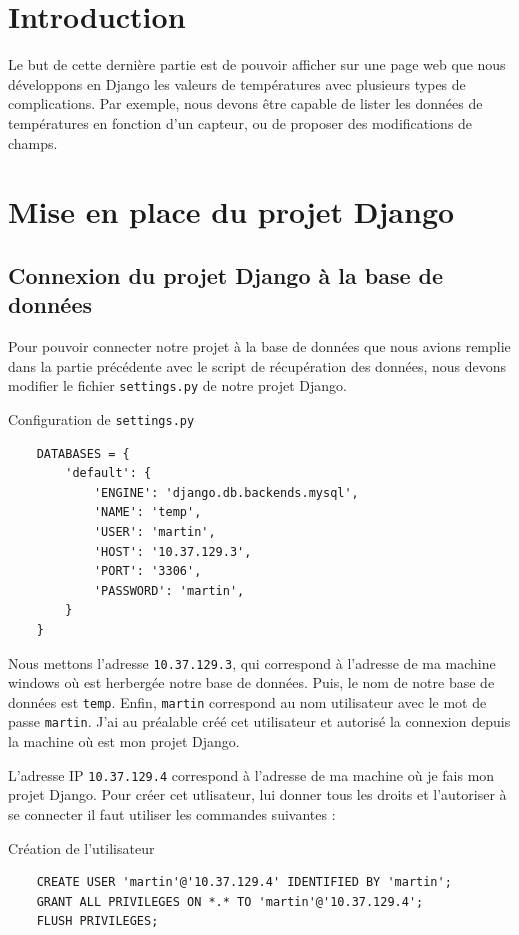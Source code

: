 \documentclass[12pt, a4paper]{article}
\begin{document}
\newpage
\section{Introduction}
Le but de cette dernière partie est de pouvoir afficher sur une page web que nous
développons en Django les valeurs de températures avec plusieurs types de complications. 
Par exemple, nous devons être capable de lister les données de températures en fonction d'un
capteur, ou de proposer des modifications de champs. 

\section{Mise en place du projet Django}
\subsection{Connexion du projet Django à la base de données}
	Pour pouvoir connecter notre projet à la base de données que nous avions remplie
	dans la partie précédente avec le script de récupération des données, nous devons 
	modifier le fichier \texttt{settings.py} de notre projet Django.

	\begin{listing}[H]
		\caption{Configuration de \texttt{settings.py}}
		\label{lst:settings}
		\begin{verbatim}
	DATABASES = {
		'default': {
			'ENGINE': 'django.db.backends.mysql',
			'NAME': 'temp', 
			'USER': 'martin',
			'HOST': '10.37.129.3',
			'PORT': '3306',
			'PASSWORD': 'martin',
		}
	}
		\end{verbatim}
	\end{listing}

	Nous mettons l'adresse \texttt{10.37.129.3}, qui correspond à l'adresse de ma machine 
	windows où est herbergée notre base de données. Puis, le nom de
	notre base de données est \texttt{temp}. Enfin, \texttt{martin} correspond au nom utilisateur
	avec le mot de passe \texttt{martin}. J'ai au préalable créé cet utilisateur et 
	autorisé la connexion depuis la machine où est mon projet Django.
	
	\newpage
	L'adresse IP \texttt{10.37.129.4} correspond à l'adresse de ma machine où je fais 
	mon projet Django. 
	Pour créer cet utlisateur, lui donner tous les droits et l'autoriser à se connecter il faut
	utiliser les commandes suivantes :
	\begin{listing}[H]
		\caption{Création de l'utilisateur}
		\label{lst:user}
		\begin{verbatim}
	CREATE USER 'martin'@'10.37.129.4' IDENTIFIED BY 'martin';
	GRANT ALL PRIVILEGES ON *.* TO 'martin'@'10.37.129.4';
	FLUSH PRIVILEGES;
		\end{verbatim}
	\end{listing}
\end{document}
